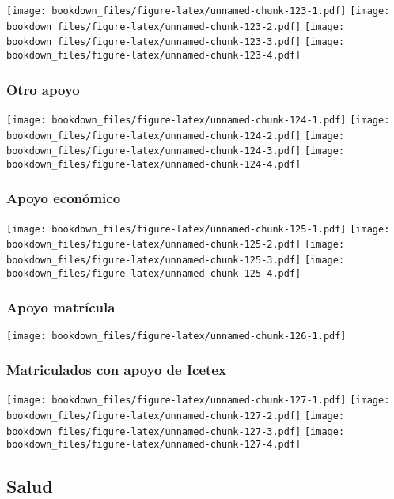 \documentclass[]{article}
\theoremstyle{definition}
\theoremstyle{definition}
\theoremstyle{definition}
\theoremstyle{remark}
\begin{document}
\texttt{[image: bookdown\_files/figure-latex/unnamed-chunk-123-1.pdf]}
\texttt{[image: bookdown\_files/figure-latex/unnamed-chunk-123-2.pdf]}
\texttt{[image: bookdown\_files/figure-latex/unnamed-chunk-123-3.pdf]}
\texttt{[image: bookdown\_files/figure-latex/unnamed-chunk-123-4.pdf]}

\subsubsection{Otro apoyo}\label{otro-apoyo}

\texttt{[image: bookdown\_files/figure-latex/unnamed-chunk-124-1.pdf]}
\texttt{[image: bookdown\_files/figure-latex/unnamed-chunk-124-2.pdf]}
\texttt{[image: bookdown\_files/figure-latex/unnamed-chunk-124-3.pdf]}
\texttt{[image: bookdown\_files/figure-latex/unnamed-chunk-124-4.pdf]}

\subsubsection{Apoyo económico}\label{apoyo-economico}

\texttt{[image: bookdown\_files/figure-latex/unnamed-chunk-125-1.pdf]}
\texttt{[image: bookdown\_files/figure-latex/unnamed-chunk-125-2.pdf]}
\texttt{[image: bookdown\_files/figure-latex/unnamed-chunk-125-3.pdf]}
\texttt{[image: bookdown\_files/figure-latex/unnamed-chunk-125-4.pdf]}

\subsubsection{Apoyo matrícula}\label{apoyo-matricula}

\texttt{[image: bookdown\_files/figure-latex/unnamed-chunk-126-1.pdf]}

\subsubsection{Matriculados con apoyo de
Icetex}\label{matriculados-con-apoyo-de-icetex}

\texttt{[image: bookdown\_files/figure-latex/unnamed-chunk-127-1.pdf]}
\texttt{[image: bookdown\_files/figure-latex/unnamed-chunk-127-2.pdf]}
\texttt{[image: bookdown\_files/figure-latex/unnamed-chunk-127-3.pdf]}
\texttt{[image: bookdown\_files/figure-latex/unnamed-chunk-127-4.pdf]}

\subsection{Salud}\label{salud}
\end{document}
